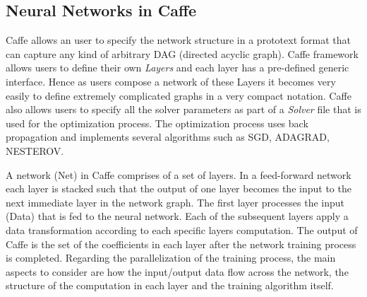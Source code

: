 \subsection{Neural Networks in Caffe}
Caffe allows an user to specify the network structure in a prototext format \cite{protocol-buffer} 
that can capture any kind of arbitrary DAG (directed acyclic graph).
Caffe framework allows users to define their own \emph{Layers} and each layer has a pre-defined generic interface. 
Hence as users compose a network of these Layers it becomes very easily to define extremely complicated graphs in a very compact notation. 
Caffe also allows users to specify all the solver parameters as part of a \emph{Solver} file that is used for the optimization process. 
The optimization process uses back propagation and implements several algorithms such as SGD, ADAGRAD, NESTEROV. 

A network (Net) in Caffe comprises of a set of layers. In a feed-forward network each layer is stacked
such that the output of one layer becomes the input to the next immediate layer in the network graph. 
The first layer processes the input (Data) that is fed to the neural
network. Each of the subsequent layers apply a data transformation 
according to each specific layers computation. The output of Caffe is the 
set of the coefficients in each layer after the network training process is
completed. Regarding the parallelization of the training process, the
main aspects to consider are how the input/output data flow across
the network, the structure of the computation in each layer and the
training algorithm itself.

